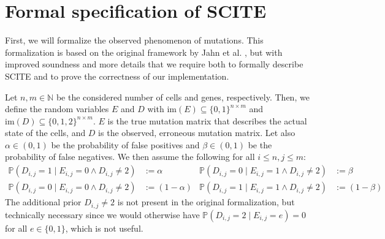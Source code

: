 \section{Formal specification of SCITE}

First, we will formalize the observed phenomenon of mutations. This formalization is based on the original framework by Jahn et al. \cite{tree2016}, but with improved soundness and more details that we require both to formally describe \ac{SCITE} and to prove the correctness of our implementation. 

\begin{definition}
    \label{def:mutmatrix}
    Let $n, m \in \mathbb{N}$ be the considered number of cells and genes, respectively. Then, we define the random variables $E$ and $D$ with $\mathrm{im}(E) \subseteq \{0,1\}^{n \times m}$ and $\mathrm{im}(D) \subseteq \{0, 1, 2\}^{n \times m}$. $E$ is the true mutation matrix that describes the actual state of the cells, and $D$ is the observed, erroneous mutation matrix. Let also $\alpha \in (0,1)$ be the probability of false positives and $\beta \in (0,1)$ be the probability of false negatives. We then assume the following for all $i \leq n, j \leq m$:
    \begin{align*}
        \mathbb{P}(D_{i,j} = 1 \mid E_{i,j} = 0 \wedge D_{i,j} \neq 2) &:= \alpha & \mathbb{P}(D_{i,j} = 0\mid E_{i,j} = 1 \wedge D_{i,j} \neq 2) &:= \beta \\
        \mathbb{P}(D_{i,j} = 0 \mid E_{i,j} = 0 \wedge D_{i,j} \neq 2) &:= (1-\alpha) & \mathbb{P}(D_{i,j} = 1 \mid E_{i,j} = 1 \wedge D_{i,j} \neq 2) &:= (1-\beta)
    \end{align*}
    The additional prior $D_{i,j} \neq 2$ is not present in the original formalization, but technically necessary since we would otherwise have $\mathbb{P}(D_{i,j} = 2 \mid E_{i,j} = e) = 0$ for all $e \in \{0,1\}$, which is not useful.
\end{definition}


